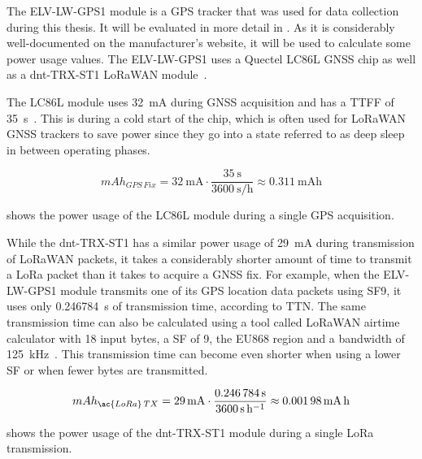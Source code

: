 The ELV-LW-GPS1 module is a \ac{GPS} tracker that was used for data collection during this thesis.
It will be evaluated in more detail in .
As it is considerably well-documented on the manufacturer's website, it will be used to calculate some power usage values.
The ELV-LW-GPS1 uses a Quectel LC86L \ac{GNSS} chip as well as a dnt-TRX-ST1 \ac{LoRaWAN} module~\cite{elv_elektronik_ag_elv_2023}.

The LC86L module uses \SI{32}{\milli\ampere} during \ac{GNSS} acquisition and has a \ac{TTFF} of \SI{35}{\second}~\cite{quectel_gnss_nodate}.
This is during a cold start of the chip, which is often used for \ac{LoRaWAN} \ac{GNSS} trackers to save power since they go into a state referred to as deep sleep in between operating phases.

\begin{equation}\label{eq:LC86L-fix-consumption}
    mAh_{GPS\,Fix} = \SI{32}{\milli\ampere} \cdot \frac{\SI{35}{\second}}{\SI{3600}{\second\per\hour}} \approx \SI{0.311}{\milli\ampere\hour}
\end{equation}

 shows the power usage of the LC86L module during a single \ac{GPS} acquisition.

While the dnt-TRX-ST1 has a similar power usage of \SI{29}{\milli\ampere} during transmission of \ac{LoRaWAN} packets, it takes a considerably shorter amount of time to transmit a \ac{LoRa} packet than it takes to acquire a \ac{GNSS} fix.
For example, when the ELV-LW-GPS1 module transmits one of its \ac{GPS} location data packets using \ac{SF}9, it uses only \SI{0.246784}{\second} of transmission time, according to \ac{TTN}.
The same transmission time can also be calculated using a tool called \ac{LoRaWAN airtime calculator} with 18 input bytes, a \ac{SF} of 9, the EU868 region and a bandwidth of \SI{125}{\kilo\hertz}~\cite{the_things_network_lorawan_nodate}.
This transmission time can become even shorter when using a lower \ac{SF} or when fewer bytes are transmitted.

\begin{equation}\label{eq:dnt-TRX-ST1-tx-consumption}
    mAh_{\ac{LoRa}\,TX} = \SI{29}{\milli\ampere} \cdot \frac{\SI{0.246784}{\second}}{\SI{3600}{\second\per\hour}} \approx \SI{0.00198}{\milli\ampere\hour}
\end{equation}

 shows the power usage of the dnt-TRX-ST1 module during a single \ac{LoRa} transmission.

